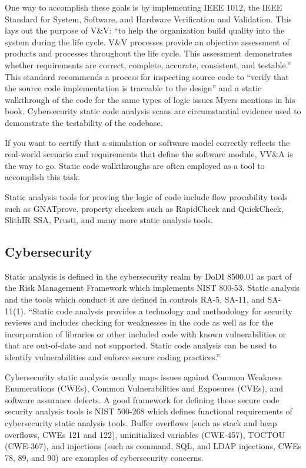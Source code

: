 One way to accomplish these goals is by implementing IEEE 1012, the IEEE Standard for System, Software, and Hardware Verification and Validation. This lays out the purpose of V\&V: ``to help the organization build quality into the system during the life cycle. V\&V processes provide an objective assessment of products and processes throughout the life cycle. This assessment demonstrates whether requirements are correct, complete, accurate, consistent, and testable.'' This standard recommends a process for inspecting source code to ``verify that the source code implementation is traceable to the design'' and a static walkthrough of the code for the same types of logic issues Myers mentions in his book.\autocite[\ppno~10,213,216]{20230918:ieee1012} Cybersecurity static code analysis scans are circumstantial evidence used to demonstrate the testability of the codebase.\autocite[\pno~206]{20230918:ieee1012}

If you want to certify that a simulation or software model correctly reflects the real-world scenario and requirements that define the software module, VV\&A is the way to go. Static code walkthroughs are often employed as a tool to accomplish this task.

Static analysis tools for proving the logic of code include flow provability tools such as GNATprove, property checkers\autocite{20230918:foster2015trends} such as RapidCheck and QuickCheck\autocite{20230918:jones2003}, SlithIR SSA, Prusti, and many more static analysis tools.

\subsection{Cybersecurity}

Static analysis is defined in the cybersecurity realm by DoDI 8500.01 as part of the Risk Management Framework which implements NIST 800-53.\autocite{20230918:dodi850001} Static analysis and the tools which conduct it are defined in controls RA-5, SA-11, and SA-11(1). ``Static code analysis provides a technology and methodology for security reviews and includes checking for weaknesses in the code as well as for the incorporation of libraries or other included code with known vulnerabilities or that are out-of-date and not supported. Static code analysis can be used to identify vulnerabilities and enforce secure coding practices.''\autocite[\pno~277]{20230918:nist80053rev5}

Cybersecurity static analysis usually maps issues against Common Weakness Enumerations (CWEs), Common Vulnerabilities and Exposures (CVEs), and software assurance defects. A good framework for defining these secure code security analysis tools is NIST 500-268 which defines functional requirements of cybersecurity static analysis tools. Buffer overflows (such as stack and heap overflows, CWEs 121 and 122), uninitialized variables (CWE-457),  TOCTOU (CWE-367), and injections (such as command, SQL, and LDAP injections, CWEs 78, 89, and 90) are examples of cybersecurity concerns.\autocite{20230918:nist500268}

